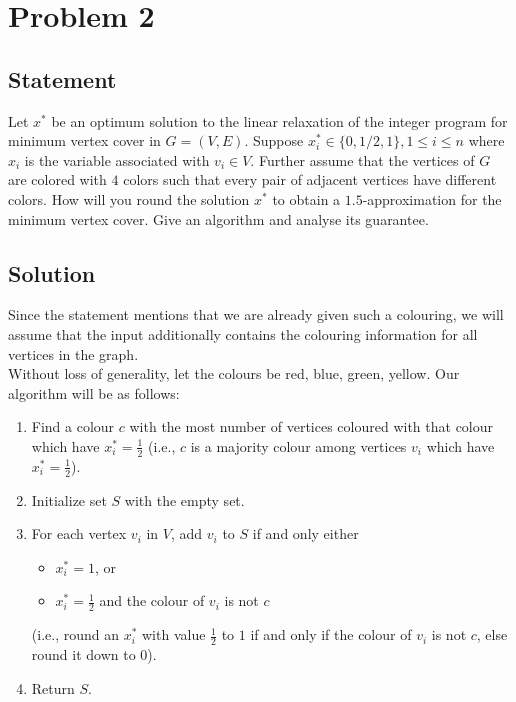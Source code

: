 \documentclass[a4paper]{article}
\newcommand{\nl}{\vspace{0.2cm}\\}
\begin{document}
\newpage

\section{Problem 2}

\subsection{Statement}

Let $x^*$ be an optimum solution to the linear relaxation of the integer program for minimum vertex cover in $G = (V, E)$. Suppose $x_i^* \in \{0,1/2,1\},1 \le i \le n$ where $x_i$ is the variable
associated with $v_i \in V$. Further assume that the vertices of $G$ are colored with $4$ colors such that every pair of adjacent vertices have different colors. How will you round the solution
$x^*$ to obtain a $1.5$-approximation for the minimum vertex cover. Give an algorithm and analyse its guarantee.

\subsection{Solution}

Since the statement mentions that we are already given such a colouring, we will assume that the input additionally contains the colouring information for all vertices in the graph.\nl
Without loss of generality, let the colours be red, blue, green, yellow. Our algorithm will be as follows:

\begin{enumerate}
    \item Find a colour $c$ with the most number of vertices coloured with that colour which have $x_i^* = \frac{1}{2}$ (i.e., $c$ is a majority colour among vertices $v_i$ which have $x_i^* =
        \frac{1}{2}$).
    \item Initialize set $S$ with the empty set.
    \item For each vertex $v_i$ in $V$, add $v_i$ to $S$ if and only either
        \begin{itemize}
            \item $x_i^* = 1$, or
            \item $x_i^* = \frac{1}{2}$ and the colour of $v_i$ is not $c$
        \end{itemize}
        (i.e., round an $x_i^*$ with value $\frac{1}{2}$ to $1$ if and only if the colour of $v_i$ is not $c$, else round it down to $0$).
    \item Return $S$.
\end{enumerate}
\end{document}
